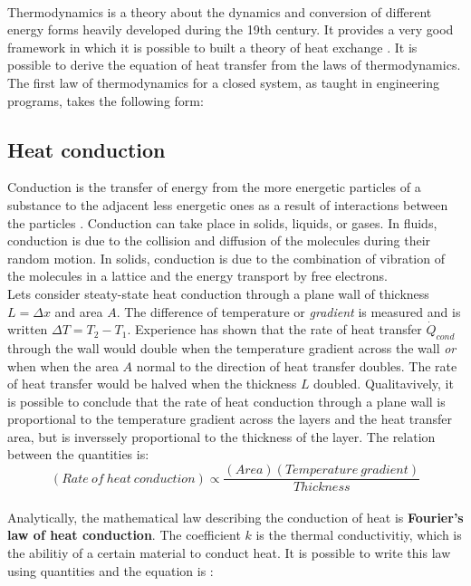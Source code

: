 \\
\break
\normalsize{\indent Thermodynamics is a theory about the dynamics and conversion of different energy forms heavily developed during the 19th century. It provides a very good framework in which it is possible to built a theory of heat exchange \cites{ahtt6e}. It is possible to derive the equation of heat transfer from the laws of thermodynamics. The first law of thermodynamics for a closed system, as taught in engineering programs, takes the following form:}

\subsection{Heat conduction} \label{HEAT CONDUCTION THEORY}

\normalsize{Conduction is the transfer of energy from the more energetic particles of a substance to the adjacent less energetic ones as a result of interactions between the particles \cites{cengel2004heat}. Conduction can take place in solids, liquids, or gases. In fluids, conduction is due to the collision and diffusion of the molecules during their random motion. In solids, conduction is due to the combination of vibration of the molecules in a lattice and the energy transport by free electrons.}
\\
\break
\normalsize{\indent Lets consider steaty-state heat conduction through a plane wall of thickness $L  = \Delta x$ and area $A$. The difference of temperature or {\it gradient} is measured and is written $\Delta T = T_2 - T_1$. Experience has shown that the rate of heat transfer $\dot{Q}_{cond}$ through the wall would double when the temperature gradient across the wall {\it or} when when the area $A$ normal to the direction of heat transfer doubles. The rate of heat transfer would be halved when the thickness $L$ doubled. Qualitavively, it is possible to conclude that the rate of heat conduction through a plane wall is proportional to the temperature gradient across the layers and the heat transfer area, but is inverssely proportional to the thickness of the layer. The relation between the quantities is:}
\\
\begin{equation}
    (Rate \ of \ heat \ conduction) \propto \frac{(Area)(Temperature \ gradient)}{Thickness}
    \label{eqn:CondEq}
\end{equation}
\\
\normalsize{\indent Analytically, the mathematical law describing the conduction of heat is {\bfseries Fourier's law of heat conduction}. The coefficient $k$ is the thermal conductivitiy, which is the abilitiy of a certain material to conduct heat. It is possible to write this law using quantities and the equation is :}
